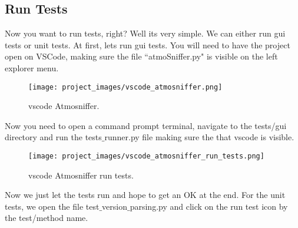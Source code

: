 \subsection{Run Tests}
Now you want to run tests, right? Well its very simple. We can either run gui tests or unit tests. At first, lets run gui tests. You will need to have the project open on VSCode, making sure the file ``atmoSniffer.py" is visible on the left explorer menu.

\begin{figure}[H]
\centering
\texttt{[image: project\_images/vscode\_atmosniffer.png]}
 \caption{vscode Atmosniffer.}
 \label{fig:vscode_atmo}
\end{figure}

Now you need to open a command prompt terminal, navigate to the tests/gui directory and run the tests$\_$runner.py file making sure the that vscode is visible.

\begin{figure}[H]
\centering
\texttt{[image: project\_images/vscode\_atmosniffer\_run\_tests.png]}
 \caption{vscode Atmosniffer run tests.}
 \label{fig:vscode_atmo_run_tests}
\end{figure}

Now we just let the tests run and hope to get an OK at the end. For the unit tests, we open the file test$\_$version$\_$parsing.py and click on the run test icon by the test/method name.


